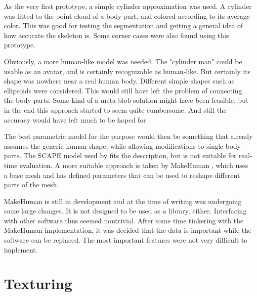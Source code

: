 As the very first prototype, a simple cylinder approximation was used. A cylinder was fitted to the point cloud of a body part, and colored according to its average color. This was good for testing the segmentation and getting a general idea of how accurate the skeleton is. Some corner cases were also found using this prototype. 

Obviously, a more human-like model was needed. The "cylinder man" could be usable as an avatar, and is certainly recognizable as human-like. But certainly its shape was nowhere near a real human body. Different simple shapes such as ellipsoids were considered. This would still have left the problem of connecting the body parts. Some kind of a meta-blob solution might have been feasible, but in the end this approach started to seem quite cumbersome. And still the accuracy would have left much to be hoped for.

The best parametric model for the purpose would then be something that already assumes the generic human shape, while allowing  modifications to single body parts. The SCAPE model \citep{anguelov2005scape} used by \citet{weiss2011home} fits the description, but is not suitable for real-time evaluation. A more suitable approach is taken by MakeHuman \citep{makehuman}, which uses a base mesh and has defined parameters that can be used to reshape different parts of the mesh.

MakeHuman is still in development and at the time of writing was undergoing some large changes. It is not designed to be used as a library, either. Interfacing with other software thus seemed nontrivial. After some time tinkering with the MakeHuman implementation, it was decided that the data is important while the software can be replaced. The most important features were not very difficult to implement.


\section{Texturing}




